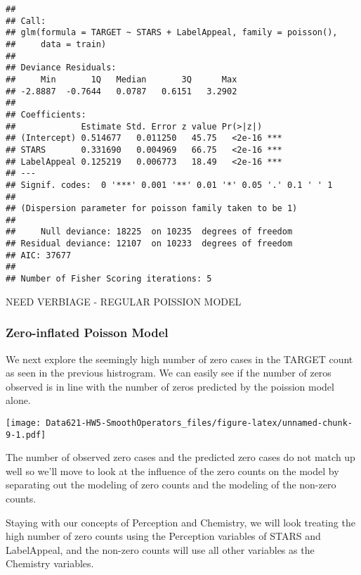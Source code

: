 \documentclass[]{article}
\begin{document}
\begin{verbatim}
## 
## Call:
## glm(formula = TARGET ~ STARS + LabelAppeal, family = poisson(), 
##     data = train)
## 
## Deviance Residuals: 
##     Min       1Q   Median       3Q      Max  
## -2.8887  -0.7644   0.0787   0.6151   3.2902  
## 
## Coefficients:
##             Estimate Std. Error z value Pr(>|z|)    
## (Intercept) 0.514677   0.011250   45.75   <2e-16 ***
## STARS       0.331690   0.004969   66.75   <2e-16 ***
## LabelAppeal 0.125219   0.006773   18.49   <2e-16 ***
## ---
## Signif. codes:  0 '***' 0.001 '**' 0.01 '*' 0.05 '.' 0.1 ' ' 1
## 
## (Dispersion parameter for poisson family taken to be 1)
## 
##     Null deviance: 18225  on 10235  degrees of freedom
## Residual deviance: 12107  on 10233  degrees of freedom
## AIC: 37677
## 
## Number of Fisher Scoring iterations: 5
\end{verbatim}

NEED VERBIAGE - REGULAR POISSION MODEL

\subsubsection{Zero-inflated Poisson
Model}\label{zero-inflated-poisson-model}

We next explore the seemingly high number of zero cases in the TARGET
count as seen in the previous histrogram. We can easily see if the
number of zeros observed is in line with the number of zeros predicted
by the poission model alone.

\texttt{[image: Data621-HW5-SmoothOperators\_files/figure-latex/unnamed-chunk-9-1.pdf]}

The number of observed zero cases and the predicted zero cases do not
match up well so we'll move to look at the influence of the zero counts
on the model by separating out the modeling of zero counts and the
modeling of the non-zero counts.

Staying with our concepts of Perception and Chemistry, we will look
treating the high number of zero counts using the Perception variables
of STARS and LabelAppeal, and the non-zero counts will use all other
variables as the Chemistry variables.
\end{document}
